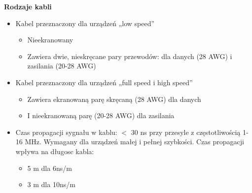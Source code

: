 			\textbf{Rodzaje kabli}
			\begin{itemize}
				\item Kabel przeznaczony dla urządzeń „low speed”
				\begin{itemize}
					\item Nieekranowany
					\item Zawiera dwie, nieskręcane pary przewodów: dla danych (28 AWG) i zasilania (20-28 AWG)
				\end{itemize}
				\item Kabel przeznaczony dla urządzeń „full speed i high speed”
				\begin{itemize}
					\item Zawiera ekranowaną parę skręcaną (28 AWG) dla danych
					\item I nieekranowaną parę (20-28 AWG) dla zasilania
				\end{itemize}
				\item Czas propagacji sygnału w kablu: $<$ 30 ns przy przesyle z częstotliwością 1-16 MHz. Wymagany dla urządzeń małej i pełnej szybkości. Czas propagacji wpływa na długosc kabla:
				\begin{itemize}
					\item 5 m dla 6ns/m
					\item 3 m dla 10ns/m
				\end{itemize}
			\end{itemize}
